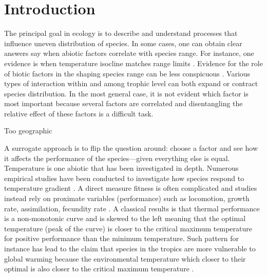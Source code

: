 \section*{Introduction}
The principal goal in ecology is to describe and understand processes that influence uneven distribution of species.
In some cases, one can obtain clear answers say when abiotic factors correlate with species range.
For instance, one evidence is when temperature isocline matches  range limits \citep{Root1988}.
Evidence for the role of biotic factors in the shaping species range can be less conspicuous \citep{Krebs2000}.
Various types of interaction within and among trophic level can both expand or contract species distribution.
In the most general case, it is not evident which factor is most important because several factors are correlated and disentangling the relative effect of these factors is a difficult task.

Too geographic


A surrogate approach is to flip the question around: choose a factor and see how it affects the performance of the species---given everything else is equal.
Temperature is one abiotic that has been investigated in depth.
Numerous empirical studies have been conducted to investigate how species respond to temperature gradient \citep[e.g.,][]{Angilletta2009}.
A direct measure fitness is often complicated and studies instead rely on proximate variables (performance) such as locomotion, growth rate, assimilation, fecundity rate \citep[][and reference therein]{Angilletta2009}.
A classical results is that thermal performance is a non-monotonic curve and is skewed to the left meaning that the optimal temperature (peak of the curve) is closer to the critical maximum temperature for positive performance than the minimum temperature. 
Such pattern for instance has lead to the claim that species in the tropics are more vulnerable to global warming because the environmental temperature which closer to their optimal  is also  closer to the critical maximum temperature \citep{Deutsch2008}.


